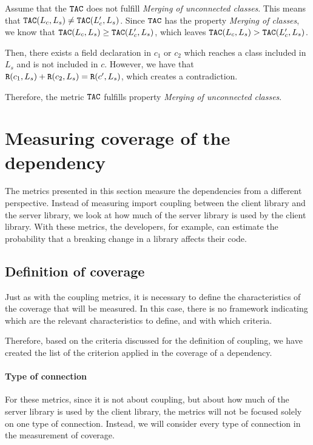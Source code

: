 Assume that the $\verb|TAC|$ does not fulfill \textit{Merging of unconnected classes}. This means that $\verb|TAC|(L_c, L_s) \neq \verb|TAC|(L_c', L_s)$. Since $\verb|TAC|$ has the property \textit{Merging of classes}, we know that $\verb|TAC|(L_c, L_s) \geq \verb|TAC|(L_c', L_s)$, which leaves $\verb|TAC|(L_c, L_s) > \verb|TAC|(L_c', L_s)$.

Then, there exists a field declaration in $c_1$ or $c_2$ which reaches a class included in $L_s$ and is not included in $c$. However, we have that $\verb|R|(c_1, L_s) + \verb|R|(c_2, L_s) = \verb|R|(c', L_s)$, which creates a contradiction.

Therefore, the metric $\verb|TAC|$ fulfills property \textit{Merging of unconnected classes}.

\section{Measuring coverage of the dependency}\label{sec:coverageMetrics}
The metrics presented in this section measure the dependencies from a different perspective. Instead of measuring import coupling between the client library and the server library, we look at how much of the server library is used by the client library. With these metrics, the developers, for example, can estimate the probability that a breaking change in a library affects their code.

\subsection{Definition of coverage}\label{subsect:usage-definition}
Just as with the coupling metrics, it is necessary to define the characteristics of the coverage that will be measured. In this case, there is no framework indicating which are the relevant characteristics to define, and with which criteria.

Therefore, based on the criteria discussed for the definition of coupling, we have created the list of the criterion applied in the coverage of a dependency.

\paragraph{Type of connection}
For these metrics, since it is not about coupling, but about how much of the server library is used by the client library, the metrics will not be focused solely on one type of connection. Instead, we will consider every type of connection in the measurement of coverage.

